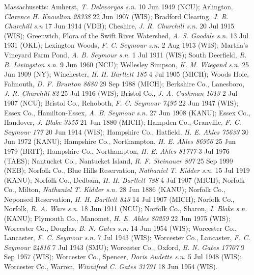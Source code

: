 \documentclass{article}
\begin{document}
Massachusetts:
Amherst, \textit{T. Delevoryas s.n.} 10 Jun 1949 (NCU);
Arlington, \textit{Clarence H. Knowlton 28338} 22 Jun 1907 (WIS);
Bradford Clearing, \textit{J. R. Churchill s.n} 17 Jun 1914 (VDB);
Cheshire, \textit{J. R. Churchill s.n.} 20 Jul 1915 (WIS);
Greenwich, Flora of the Swift River Watershed, \textit{A. S. Goodale s.n.} 13 Jul 1931 (OKL);
Lexington Woods, \textit{F. C. Seymour s.n.} 2 Aug 1913 (WIS);
Martha's Vineyard Farm Pond, \textit{A. B. Seymour s.n.} 1 Jul 1911 (WIS);
South Deerfield, \textit{R. B. Livingston s.n.} 9 Jun 1960 (NCU);
Wellesley Simpson, \textit{K. M. Wiegand s.n.} 25 Jun 1909 (NY);
Winchester, \textit{H. H. Bartlett 185} 4 Jul 1905 (MICH);
Woods Hole, Falmouth, \textit{D. F. Brunton 8680} 29 Sep 1988 (MICH);
Berkshire Co., Lanesboro, \textit{J. R. Churchill 82} 25 Jul 1916 (WIS);
Bristol Co., \textit{J. A. Cushman 1013} 2 Jul 1907 (NCU);
Bristol Co., Rehoboth, \textit{F. C. Seymour 7495} 22 Jun 1947 (WIS);
Essex Co., Hamilton-Essex, \textit{A. B. Seymour s.n.} 27 Jun 1908 (KANU);
Essex Co., Handover, \textit{J. Blake 3355} 21 Jun 1880 (MICH);
Hampden Co., Granville, \textit{F. C. Seymour 177} 20 Jun 1914 (WIS);
Hampshire Co., Hatfield, \textit{H. E. Ahles 75633} 30 Jun 1972 (KANU);
Hampshire Co., Northampton, \textit{H. E. Ahles 86956} 25 Jun 1979 (BRIT);
Hampshire Co., Northampton, \textit{H. E. Ahles 81777} 3 Jul 1976 (TAES);
Nantucket Co., Nantucket Island, \textit{R. F. Steinauer 807} 25 Sep 1999 (NEB);
Norfolk Co., Blue Hills Reservation, \textit{Nathaniel T. Kidder s.n.} 15 Jul 1919 (KANU);
Norfolk Co., Dedbam, \textit{H. H. Bartlett 788} 4 Jul 1907 (MICH);
Norfolk Co., Milton, \textit{Nathaniel T. Kidder s.n.} 28 Jun 1886 (KANU);
Norfolk Co., Neponsed Reservation, \textit{H. H. Bartlett 843} 14 Jul 1907 (MICH);
Norfolk Co., Norfolk, \textit{R. A. Ware s.n.} 18 Jun 1911 (NCU);
Norfolk Co., Sharon, \textit{J. Blake s.n.}  (KANU);
Plymouth Co., Manomet, \textit{H. E. Ahles 80259} 22 Jun 1975 (WIS);
Worcester Co., Douglas, \textit{B. N. Gates s.n.} 14 Jun 1954 (WIS);
Worcester Co., Lancaster, \textit{F. C. Seymour s.n.} 7 Jul 1943 (WIS);
Worcester Co., Lancaster, \textit{F. C. Seymour 24816} 7 Jul 1943 (SMU);
Worcester Co., Oxford, \textit{B. N. Gates 17707} 9 Sep 1957 (WIS);
Worcester Co., Spencer, \textit{Doris Audette s.n.} 5 Jul 1948 (WIS);
Worcester Co., Warren, \textit{Winnifred C. Gates 31791} 18 Jun 1954 (WIS).
\end{document}
